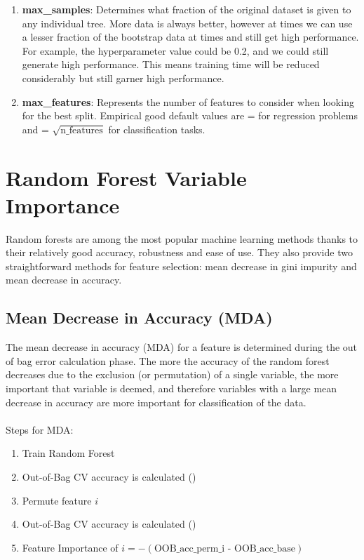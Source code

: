 \documentclass[12pt]{article}
\begin{document}
\begin{enumerate}
    \item \textbf{max\_samples}: Determines what fraction of the original dataset is given to any individual tree. More data is always better, however at times we can use a lesser fraction of the bootstrap data at times and still get high performance. For example, the hyperparameter value could be 0.2, and we could still generate high performance. This means training time will be reduced considerably but still garner high performance. 
    
    \item \textbf{max\_features}: Represents the number of features to consider when looking for the best split.  Empirical good default values are  =  for regression problems and  = $\sqrt{\text{n\_features}}$ for classification tasks. 
    
    
\end{enumerate}

\section{Random Forest Variable Importance}
Random forests are among the most popular machine learning methods thanks to their relatively good accuracy, robustness and ease of use. They also provide two straightforward methods for feature selection: mean decrease in gini impurity and mean decrease in accuracy.

\subsection{Mean Decrease in Accuracy (MDA)}
The mean decrease in accuracy (MDA) for a feature is determined during the out of bag error calculation phase. The more the accuracy of the random forest decreases due to the exclusion (or permutation) of a single variable, the more important that variable is deemed, and therefore variables with a large mean decrease in accuracy are more important for classification of the data. \\\\
Steps for MDA:
\begin{enumerate}
    \item Train Random Forest
    \item Out-of-Bag CV accuracy is calculated ()
    \item Permute feature $i$
    \item Out-of-Bag CV accuracy is calculated ()
    \item Feature Importance of $i = - (\text{OOB\_acc\_perm\_i - OOB\_acc\_base})$
\end{enumerate}
\end{document}
